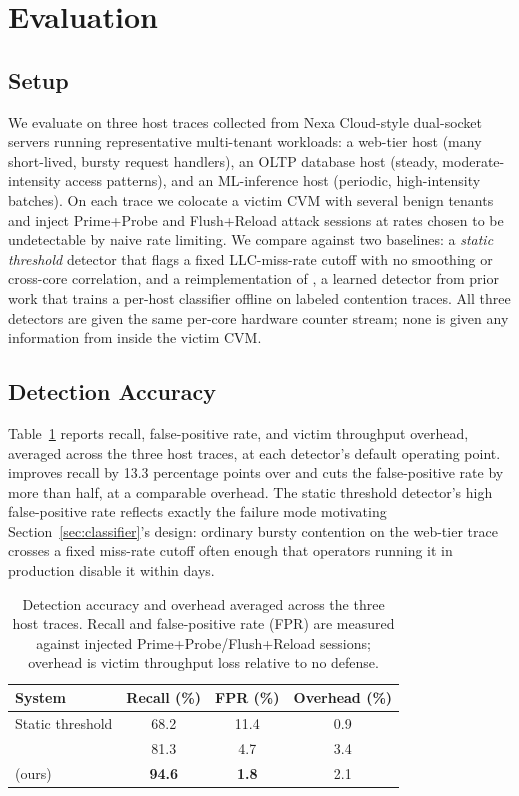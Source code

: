 \section{Evaluation}
\label{sec:evaluation}

\subsection{Setup}

We evaluate \sysname{} on three host traces collected from Nexa Cloud-style dual-socket
servers running representative multi-tenant workloads: a web-tier host (many short-lived,
bursty request handlers), an OLTP database host (steady, moderate-intensity access
patterns), and an ML-inference host (periodic, high-intensity batches). On each trace we
colocate a victim CVM with several benign tenants and inject Prime+Probe and Flush+Reload
attack sessions at rates chosen to be undetectable by naive rate limiting. We compare
\sysname{} against two baselines: a \emph{static threshold} detector that flags a fixed
LLC-miss-rate cutoff with no smoothing or cross-core correlation, and a reimplementation of
\baseline{}, a learned detector from prior work that trains a per-host classifier offline on
labeled contention traces. All three detectors are given the same per-core hardware counter
stream; none is given any information from inside the victim CVM.

\subsection{Detection Accuracy}

Table~\ref{tab:detection} reports recall, false-positive rate, and victim throughput
overhead, averaged across the three host traces, at each detector's default operating point.
\sysname{} improves recall by 13.3 percentage points over \baseline{} and cuts the
false-positive rate by more than half, at a comparable overhead. The static threshold
detector's high false-positive rate reflects exactly the failure mode motivating
Section~\ref{sec:classifier}'s design: ordinary bursty contention on the web-tier trace
crosses a fixed miss-rate cutoff often enough that operators running it in production
disable it within days.

\begin{table}[t]
\centering
\caption{Detection accuracy and overhead averaged across the three host traces. Recall and
false-positive rate (FPR) are measured against injected Prime+Probe/Flush+Reload sessions;
overhead is victim throughput loss relative to no defense.}
\label{tab:detection}
\begin{tabular}{lccc}
\toprule
System & Recall (\%) & FPR (\%) & Overhead (\%) \\
\midrule
Static threshold & 68.2 & 11.4 & 0.9 \\
\baseline{} & 81.3 & 4.7 & 3.4 \\
\sysname{} (ours) & \textbf{94.6} & \textbf{1.8} & 2.1 \\
\bottomrule
\end{tabular}
\end{table}

